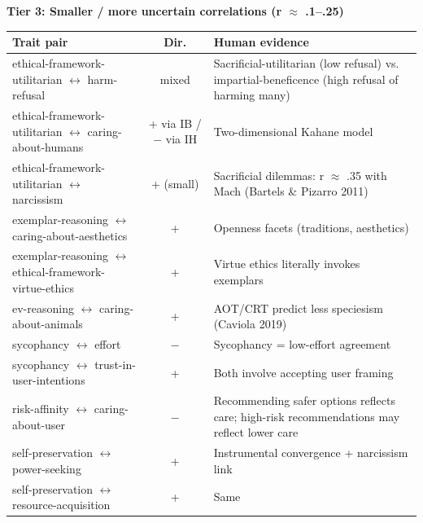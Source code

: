 \noindent\textbf{Tier 3: Smaller / more uncertain correlations (\textbar{}r\textbar{} $\approx$ .1--.25)}\\[2pt]
{\small
\begin{tabular}{p{3.9cm} c p{7.4cm}}
\hline
\textbf{Trait pair} & \textbf{Dir.} & \textbf{Human evidence} \\ \hline
ethical-framework-utilitarian $\leftrightarrow$ harm-refusal & mixed & Sacrificial-utilitarian (low refusal) vs. impartial-beneficence (high refusal of harming many) \\
ethical-framework-utilitarian $\leftrightarrow$ caring-about-humans & + via IB / $-$ via IH & Two-dimensional Kahane model \\
ethical-framework-utilitarian $\leftrightarrow$ narcissism & + (small) & Sacrificial dilemmas: r $\approx$ .35 with Mach (Bartels \& Pizarro 2011) \\
exemplar-reasoning $\leftrightarrow$ caring-about-aesthetics & + & Openness facets (traditions, aesthetics) \\
exemplar-reasoning $\leftrightarrow$ ethical-framework-virtue-ethics & + & Virtue ethics literally invokes exemplars \\
ev-reasoning $\leftrightarrow$ caring-about-animals & + & AOT/CRT predict less speciesism (Caviola 2019) \\
sycophancy $\leftrightarrow$ effort & $-$ & Sycophancy = low-effort agreement \\
sycophancy $\leftrightarrow$ trust-in-user-intentions & + & Both involve accepting user framing \\
risk-affinity $\leftrightarrow$ caring-about-user & $-$ & Recommending safer options reflects care; high-risk recommendations may reflect lower care \\
self-preservation $\leftrightarrow$ power-seeking & + & Instrumental convergence + narcissism link \\
self-preservation $\leftrightarrow$ resource-acquisition & + & Same \\
\hline
\end{tabular}}